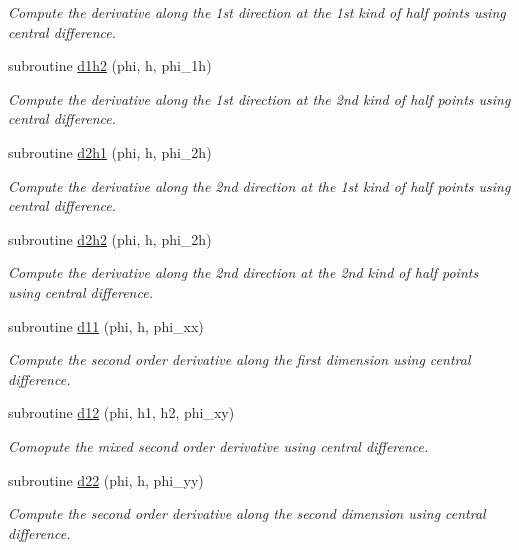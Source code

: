 \begin{DoxyCompactItemize}
\begin{DoxyCompactList}\small\item\em Compute the derivative along the 1st direction at the 1st kind of half points using central difference. \end{DoxyCompactList}\item 
subroutine \hyperlink{classmirana_a9d6168761271912ebfea872e9f322cdc}{d1h2} (phi, h, phi\-\_\-1h)
\begin{DoxyCompactList}\small\item\em Compute the derivative along the 1st direction at the 2nd kind of half points using central difference. \end{DoxyCompactList}\item 
subroutine \hyperlink{classmirana_a9341f957abd27c5132c557ae873055bd}{d2h1} (phi, h, phi\-\_\-2h)
\begin{DoxyCompactList}\small\item\em Compute the derivative along the 2nd direction at the 1st kind of half points using central difference. \end{DoxyCompactList}\item 
subroutine \hyperlink{classmirana_a4f47c93df57dd51d1414b2514fd1b339}{d2h2} (phi, h, phi\-\_\-2h)
\begin{DoxyCompactList}\small\item\em Compute the derivative along the 2nd direction at the 2nd kind of half points using central difference. \end{DoxyCompactList}\item 
subroutine \hyperlink{classmirana_ab9b1e7b5e38c6a020e05196b452e6d02}{d11} (phi, h, phi\-\_\-xx)
\begin{DoxyCompactList}\small\item\em Compute the second order derivative along the first dimension using central difference. \end{DoxyCompactList}\item 
subroutine \hyperlink{classmirana_ae9ee4058ea2b6238b6b745e4468f6a8e}{d12} (phi, h1, h2, phi\-\_\-xy)
\begin{DoxyCompactList}\small\item\em Comopute the mixed second order derivative using central difference. \end{DoxyCompactList}\item 
subroutine \hyperlink{classmirana_a9161b0947ddd188ac99d9246a1d81aed}{d22} (phi, h, phi\-\_\-yy)
\begin{DoxyCompactList}\small\item\em Compute the second order derivative along the second dimension using central difference. \end{DoxyCompactList}\item 

\end{DoxyCompactItemize}
